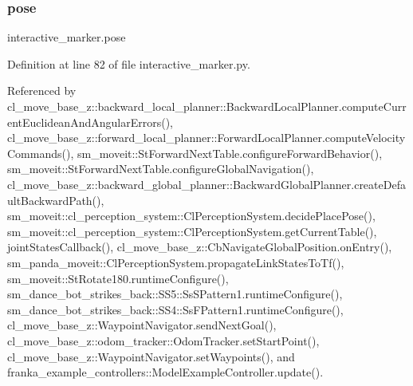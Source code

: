 \mbox{\label{namespaceinteractive__marker_a06e4691dc5f93e0da6dc9a6efa8d99b5}} 
\subsubsection{\texorpdfstring{pose}{pose}}
{\footnotesize\ttfamily interactive\+\_\+marker.\+pose}



Definition at line 82 of file interactive\+\_\+marker.\+py.



Referenced by cl\+\_\+move\+\_\+base\+\_\+z\+::backward\+\_\+local\+\_\+planner\+::\+Backward\+Local\+Planner.\+compute\+Current\+Euclidean\+And\+Angular\+Errors(), cl\+\_\+move\+\_\+base\+\_\+z\+::forward\+\_\+local\+\_\+planner\+::\+Forward\+Local\+Planner.\+compute\+Velocity\+Commands(), sm\+\_\+moveit\+::\+St\+Forward\+Next\+Table.\+configure\+Forward\+Behavior(), sm\+\_\+moveit\+::\+St\+Forward\+Next\+Table.\+configure\+Global\+Navigation(), cl\+\_\+move\+\_\+base\+\_\+z\+::backward\+\_\+global\+\_\+planner\+::\+Backward\+Global\+Planner.\+create\+Default\+Backward\+Path(), sm\+\_\+moveit\+::cl\+\_\+perception\+\_\+system\+::\+Cl\+Perception\+System.\+decide\+Place\+Pose(), sm\+\_\+moveit\+::cl\+\_\+perception\+\_\+system\+::\+Cl\+Perception\+System.\+get\+Current\+Table(), joint\+States\+Callback(), cl\+\_\+move\+\_\+base\+\_\+z\+::\+Cb\+Navigate\+Global\+Position.\+on\+Entry(), sm\+\_\+panda\+\_\+moveit\+::\+Cl\+Perception\+System.\+propagate\+Link\+States\+To\+Tf(), sm\+\_\+moveit\+::\+St\+Rotate180.\+runtime\+Configure(), sm\+\_\+dance\+\_\+bot\+\_\+strikes\+\_\+back\+::\+S\+S5\+::\+Ss\+S\+Pattern1.\+runtime\+Configure(), sm\+\_\+dance\+\_\+bot\+\_\+strikes\+\_\+back\+::\+S\+S4\+::\+Ss\+F\+Pattern1.\+runtime\+Configure(), cl\+\_\+move\+\_\+base\+\_\+z\+::\+Waypoint\+Navigator.\+send\+Next\+Goal(), cl\+\_\+move\+\_\+base\+\_\+z\+::odom\+\_\+tracker\+::\+Odom\+Tracker.\+set\+Start\+Point(), cl\+\_\+move\+\_\+base\+\_\+z\+::\+Waypoint\+Navigator.\+set\+Waypoints(), and franka\+\_\+example\+\_\+controllers\+::\+Model\+Example\+Controller.\+update().

\mbox{\label{namespaceinteractive__marker_a8e8c3785e42901a7610214ff727338ac}} 
